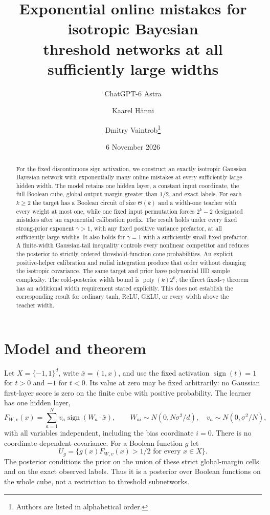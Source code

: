 \documentclass[11pt]{article}
\title{Exponential online mistakes for isotropic Bayesian\protect\\threshold networks at all sufficiently large widths}
\author{ChatGPT-6 Astra \and Kaarel H\"anni \and Dmitry Vaintrob\thanks{Authors are listed in alphabetical order.}}
\date{6 November 2026}
\newcommand{\sgn}{\operatorname{sign}}
\begin{document}
\maketitle

\begin{abstract}
For the fixed discontinuous sign activation, we construct an exactly
isotropic Gaussian Bayesian network with exponentially many online
mistakes at every sufficiently large hidden width.
The model retains one hidden layer, a constant input coordinate, the full
Boolean cube, global output margin greater than $1/2$, and exact labels.
For each $k\ge2$ the target has a Boolean circuit of size $\Theta(k)$ and
a width-one teacher with every weight at most one, while one fixed input
permutation forces $2^k-2$ designated mistakes after an exponential
calibration prefix. The result holds under every fixed strong-prior
exponent $\gamma>1$, with any fixed positive variance prefactor, at all
sufficiently large widths. It also holds for $\gamma=1$ with a sufficiently
small fixed prefactor. A finite-width Gaussian-tail inequality controls
every nonlinear competitor and reduces the posterior to strictly ordered
threshold-function cone probabilities. An explicit positive-helper
calibration and radial integration produce that order without changing
the isotropic covariance. The same target and prior have polynomial IID
sample complexity. The cold-posterior width bound is
$\operatorname{poly}(k)2^k$; the direct fixed-$\gamma$ theorem has an
additional width requirement stated explicitly. This does not establish
the corresponding result for ordinary tanh, ReLU, GELU, or every width
above the teacher width.
\end{abstract}

\section{Model and theorem}

Let $X=\{-1,1\}^d$, write $\bar x=(1,x)$, and use the fixed activation
$\sgn(t)=1$ for $t>0$ and $-1$ for $t<0$. Its value at zero may be fixed
arbitrarily: no Gaussian first-layer score is zero on the finite cube
with positive probability. The learner has one hidden layer,
\begin{equation}\label{eq:network}
 F_{W,v}(x)=\sum_{a=1}^N v_a\sgn(W_a\cdot\bar x),
 \qquad
 W_{ai}\sim N(0,N\sigma^2/d),\quad
 v_a\sim N(0,\sigma^2/N),
\end{equation}
with all variables independent, including the bias coordinate $i=0$.
There is no coordinate-dependent covariance. For a Boolean function $g$
let
\begin{equation}\label{eq:cell}
 U_g=\{g(x)F_{W,v}(x)>1/2\text{ for every }x\in X\}.
\end{equation}
The posterior conditions the prior on the union of these strict
global-margin cells and on the exact observed labels. Thus it is a
posterior over Boolean functions on the whole cube, not a restriction
to threshold subnetworks.
\end{document}
